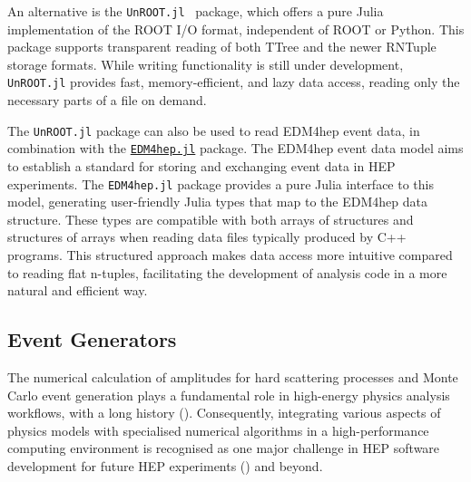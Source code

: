 \documentclass{webofc}
\begin{document}
An alternative is the \texttt{UnROOT.jl}~\cite{UnROOT:2022vnn} package,
which offers a pure Julia implementation of the ROOT I/O format, independent of
ROOT or Python. This package supports transparent reading of both TTree and the
newer RNTuple storage formats. While writing functionality is still under
development, \texttt{UnROOT.jl} provides fast, memory-efficient, and lazy data
access, reading only the necessary parts of a file on demand.

The \texttt{UnROOT.jl} package can also be used to read EDM4hep
\cite{EDM4hep:2022leb} event data, in combination with the
\href{https://github.com/JuliaHEP/EDM4hep.jl}{\texttt{EDM4hep.jl}} package. The
EDM4hep event data model aims to establish a standard for storing and exchanging
event data in HEP experiments. The \texttt{EDM4hep.jl} package provides a pure
Julia interface to this model, generating user-friendly Julia types that map to
the EDM4hep data structure. These types are compatible with both arrays of
structures and structures of arrays when reading data files typically produced
by C++ programs. This structured approach makes data access more intuitive
compared to reading flat n-tuples, facilitating the development of analysis code
in a more natural and efficient way.

\subsection{Event Generators}

The numerical calculation of amplitudes for hard scattering processes and Monte
Carlo event generation plays a fundamental role in high-energy physics analysis
workflows, with a long history (\cite{campbell2024event}). Consequently,
integrating various aspects of physics models with specialised numerical
algorithms in a high-performance computing environment is recognised as one
major challenge in HEP software development for future HEP experiments
(\cite{HEPSoftwareFoundation:2017ggl, HSFPhysicsEventGeneratorWG:2020gxw,
HSFPhysicsEventGeneratorWG:2021xti}) and beyond.
\end{document}
